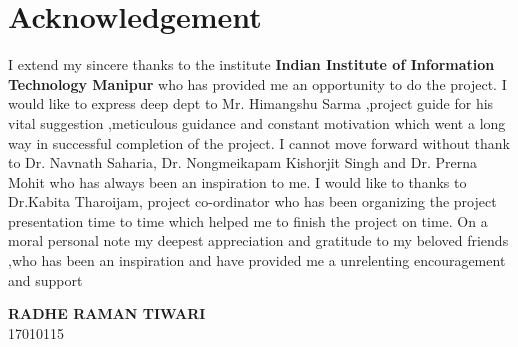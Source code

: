 \chapter*{Acknowledgement}

\thispagestyle{empty}




\begin{onehalfspace}
I extend my sincere thanks to the institute \textbf{Indian Institute of Information Technology Manipur} who has provided me an opportunity to do the project. I would like to express deep dept to Mr. Himangshu Sarma ,project guide for his vital suggestion ,meticulous guidance and constant motivation which went a long way in successful completion of the project. I cannot move forward without thank to Dr. Navnath Saharia, Dr. Nongmeikapam Kishorjit Singh and Dr. Prerna Mohit  who has always been an inspiration to me. I would like to thanks to Dr.Kabita Tharoijam, project co-ordinator who has been organizing the project presentation time to time which helped me to finish the project on time. On a moral personal note my deepest appreciation and gratitude to my beloved friends ,who has been an inspiration and have provided me a unrelenting encouragement and support
\end{onehalfspace}

\begin{flushright}
\textbf{RADHE RAMAN TIWARI}\\
17010115
\end{flushright}

